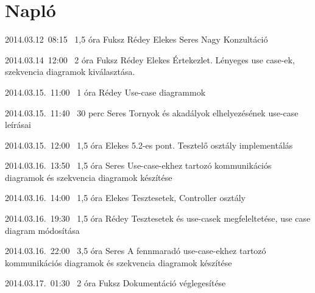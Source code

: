 %
\section{Napló}

\begin{naplo}

\bejegyzes
{2014.03.12~08:15~}
{1,5 óra}
{Fuksz\newline
Rédey\newline
Elekes\newline
Seres\newline
Nagy}
{Konzultáció}

\bejegyzes
{2014.03.14~12:00~}
{2 óra}
{Fuksz\newline
Rédey\newline
Elekes}
{Értekezlet. Lényeges use case-ek, szekvencia diagramok kiválasztása.}

\bejegyzes
{2014.03.15.~11:00~}
{1 óra}
{Rédey}
{Use-case diagrammok}

\bejegyzes
{2014.03.15.~11:40~}
{30 perc}
{Seres}
{Tornyok és akadályok elhelyezésének use-case leírásai}

\bejegyzes
{2014.03.15.~12:00~}
{1,5 óra}
{Elekes}
{5.2-es pont. Tesztelő osztály implementálás}

\bejegyzes
{2014.03.16.~13:50~}
{1,5 óra}
{Seres}
{Use-case-ekhez tartozó kommunikációs diagramok és szekvencia diagramok készítése}

\bejegyzes
{2014.03.16.~14:00~}
{1,5 óra}
{Elekes}
{Tesztesetek, Controller osztály}

\bejegyzes
{2014.03.16.~19:30~}
{1,5 óra}
{Rédey}
{Tesztesetek és use-casek megfeleltetése, use case diagram módosítása}

\bejegyzes
{2014.03.16.~22:00~}
{3,5 óra}
{Seres}
{A fennmaradó use-case-ekhez tartozó kommunikációs diagramok és szekvencia diagramok készítése}

\bejegyzes
{2014.03.17.~01:30~}
{2 óra}
{Fuksz}
{Dokumentáció véglegesítése}
\end{naplo}

